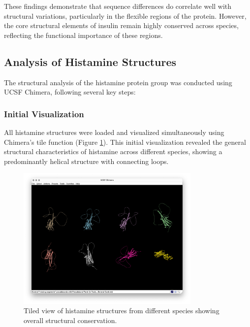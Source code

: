 \documentclass[11pt, a4paper, hidelinks]{article}
\begin{document}
These findings demonstrate that sequence differences do correlate well with structural variations, particularly in the flexible regions of the protein. However, the core structural elements of insulin remain highly conserved across species, reflecting the functional importance of these regions.

\subsection{Analysis of Histamine Structures}\label{subsec:histamine-analysis}

The structural analysis of the histamine protein group was conducted using UCSF Chimera, following several key steps:

\subsubsection{Initial Visualization}\label{subsubsec:histamine-visualization}
All histamine structures were loaded and visualized simultaneously using Chimera's tile function (Figure \ref{fig:histamine-tile}). This initial visualization revealed the general structural characteristics of histamine across different species, showing a predominantly helical structure with connecting loops.

\begin{figure}[H]
    \centering
    \includegraphics[width=0.8\textwidth]{CAA84380.1/_img/tile}
    \caption{Tiled view of histamine structures from different species showing overall structural conservation.}
    \label{fig:histamine-tile}
\end{figure}
\end{document}
